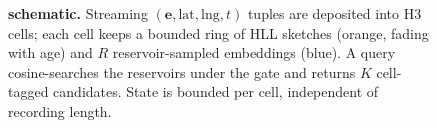 \begin{figure}[t]
\caption{\textbf{\psm{} schematic.} Streaming
$(\mathbf{e},\mathrm{lat},\mathrm{lng},t)$ tuples are deposited into H3
cells; each cell keeps a bounded ring of HLL sketches (orange, fading with
age) and $R$ reservoir-sampled embeddings (blue). A query cosine-searches
the reservoirs under the \caponek{} gate and returns $K$ cell-tagged
candidates. State is bounded per cell, independent of recording length.}
\label{fig:f1-schematic}
\end{figure}
